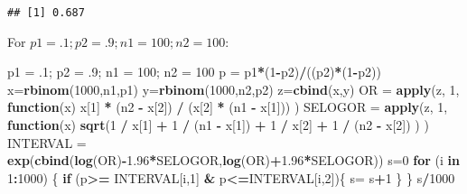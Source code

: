 \documentclass[]{article}
\newenvironment{Shaded}{\begin{snugshade}}{\end{snugshade}}
\newcommand{\KeywordTok}[1]{\textcolor[rgb]{0.13,0.29,0.53}{\textbf{#1}}}
\newcommand{\DecValTok}[1]{\textcolor[rgb]{0.00,0.00,0.81}{#1}}
\newcommand{\FloatTok}[1]{\textcolor[rgb]{0.00,0.00,0.81}{#1}}
\newcommand{\StringTok}[1]{\textcolor[rgb]{0.31,0.60,0.02}{#1}}
\newcommand{\ControlFlowTok}[1]{\textcolor[rgb]{0.13,0.29,0.53}{\textbf{#1}}}
\newcommand{\OperatorTok}[1]{\textcolor[rgb]{0.81,0.36,0.00}{\textbf{#1}}}
\newcommand{\NormalTok}[1]{#1}
\begin{document}
\begin{verbatim}
## [1] 0.687
\end{verbatim}

For \(p1 = .1; p2 = .9; n1 = 100; n2 = 100\):

\begin{Shaded}
\begin{Highlighting}[]
\NormalTok{p1 =}\StringTok{ }\NormalTok{.}\DecValTok{1}\NormalTok{; p2 =}\StringTok{ }\NormalTok{.}\DecValTok{9}\NormalTok{; n1 =}\StringTok{ }\DecValTok{100}\NormalTok{; n2 =}\StringTok{ }\DecValTok{100}
\NormalTok{p =}\StringTok{ }\NormalTok{p1}\OperatorTok{*}\NormalTok{(}\DecValTok{1}\OperatorTok{-}\NormalTok{p2)}\OperatorTok{/}\NormalTok{((p2)}\OperatorTok{*}\NormalTok{(}\DecValTok{1}\OperatorTok{-}\NormalTok{p2))}
\NormalTok{x=}\KeywordTok{rbinom}\NormalTok{(}\DecValTok{1000}\NormalTok{,n1,p1)}
\NormalTok{y=}\KeywordTok{rbinom}\NormalTok{(}\DecValTok{1000}\NormalTok{,n2,p2)}
\NormalTok{z=}\KeywordTok{cbind}\NormalTok{(x,y)}
\NormalTok{OR =}\StringTok{ }\KeywordTok{apply}\NormalTok{(z, }\DecValTok{1}\NormalTok{, }\ControlFlowTok{function}\NormalTok{(x) x[}\DecValTok{1}\NormalTok{] }\OperatorTok{*}\StringTok{ }\NormalTok{(n2 }\OperatorTok{-}\StringTok{ }\NormalTok{x[}\DecValTok{2}\NormalTok{]) }\OperatorTok{/}\StringTok{ }\NormalTok{(x[}\DecValTok{2}\NormalTok{] }\OperatorTok{*}\StringTok{ }\NormalTok{(n1 }\OperatorTok{-}\StringTok{ }\NormalTok{x[}\DecValTok{1}\NormalTok{])) )}
\NormalTok{SELOGOR =}\StringTok{ }\KeywordTok{apply}\NormalTok{(z, }\DecValTok{1}\NormalTok{, }\ControlFlowTok{function}\NormalTok{(x) }\KeywordTok{sqrt}\NormalTok{(}\DecValTok{1} \OperatorTok{/}\StringTok{ }\NormalTok{x[}\DecValTok{1}\NormalTok{] }\OperatorTok{+}\StringTok{ }\DecValTok{1} \OperatorTok{/}\StringTok{ }\NormalTok{(n1 }\OperatorTok{-}\StringTok{ }\NormalTok{x[}\DecValTok{1}\NormalTok{]) }\OperatorTok{+}\StringTok{ }\DecValTok{1} \OperatorTok{/}\StringTok{ }\NormalTok{x[}\DecValTok{2}\NormalTok{] }\OperatorTok{+}\StringTok{ }\DecValTok{1} \OperatorTok{/}\StringTok{ }\NormalTok{(n2 }\OperatorTok{-}\StringTok{ }\NormalTok{x[}\DecValTok{2}\NormalTok{]) ) )}
\NormalTok{INTERVAL =}\StringTok{ }\KeywordTok{exp}\NormalTok{(}\KeywordTok{cbind}\NormalTok{(}\KeywordTok{log}\NormalTok{(OR)}\OperatorTok{-}\FloatTok{1.96}\OperatorTok{*}\NormalTok{SELOGOR,}\KeywordTok{log}\NormalTok{(OR)}\OperatorTok{+}\FloatTok{1.96}\OperatorTok{*}\NormalTok{SELOGOR))}
\NormalTok{s=}\DecValTok{0}
\ControlFlowTok{for}\NormalTok{ (i }\ControlFlowTok{in} \DecValTok{1}\OperatorTok{:}\DecValTok{1000}\NormalTok{) \{}
  \ControlFlowTok{if}\NormalTok{ (p}\OperatorTok{>=}\StringTok{ }\NormalTok{INTERVAL[i,}\DecValTok{1}\NormalTok{] }\OperatorTok{&}\StringTok{ }\NormalTok{p}\OperatorTok{<=}\NormalTok{INTERVAL[i,}\DecValTok{2}\NormalTok{])\{}
\NormalTok{    s=}\StringTok{ }\NormalTok{s}\OperatorTok{+}\DecValTok{1}
\NormalTok{  \}}
\NormalTok{\}}
\NormalTok{s}\OperatorTok{/}\DecValTok{1000}
\end{Highlighting}
\end{Shaded}
\end{document}
